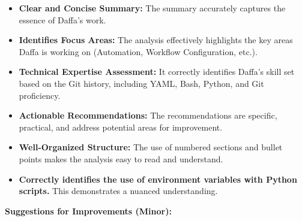 \documentclass{article}
\begin{document}
\begin{itemize}
\begin{itemize}
\begin{itemize}
\begin{itemize}
    \item \textbf{Clear and Concise Summary:} The summary accurately captures the essence of Daffa's work.
    \item \textbf{Identifies Focus Areas:}  The analysis effectively highlights the key areas Daffa is working on (Automation, Workflow Configuration, etc.).
    \item \textbf{Technical Expertise Assessment:}  It correctly identifies Daffa's skill set based on the Git history, including YAML, Bash, Python, and Git proficiency.
    \item \textbf{Actionable Recommendations:} The recommendations are specific, practical, and address potential areas for improvement.
    \item \textbf{Well-Organized Structure:} The use of numbered sections and bullet points makes the analysis easy to read and understand.
    \item \textbf{Correctly identifies the use of environment variables with Python scripts.} This demonstrates a nuanced understanding.
\end{itemize}

\textbf{Suggestions for Improvements (Minor):}


\end{itemize}
\end{itemize}
\end{itemize}
\end{document}
